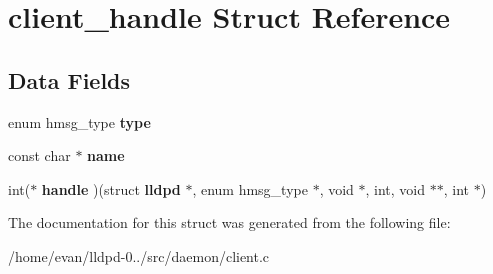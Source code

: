 \section{client\-\_\-handle \-Struct \-Reference}
\label{structclient__handle}
\subsection*{\-Data \-Fields}
\begin{DoxyCompactItemize}
\item 
enum hmsg\-\_\-type {\bfseries type}\label{structclient__handle_af67342fef4427cf671ce69f439d93674}

\item 
const char $\ast$ {\bfseries name}\label{structclient__handle_a8f8f80d37794cde9472343e4487ba3eb}

\item 
int($\ast$ {\bfseries handle} )(struct {\bf lldpd} $\ast$, enum hmsg\-\_\-type $\ast$, void $\ast$, int, void $\ast$$\ast$, int $\ast$)\label{structclient__handle_acb89fb3ba36d03dc3b80f633657bdd8b}

\end{DoxyCompactItemize}


\-The documentation for this struct was generated from the following file\-:\begin{DoxyCompactItemize}
\item 
/home/evan/lldpd-\/0../src/daemon/client.\-c\end{DoxyCompactItemize}

